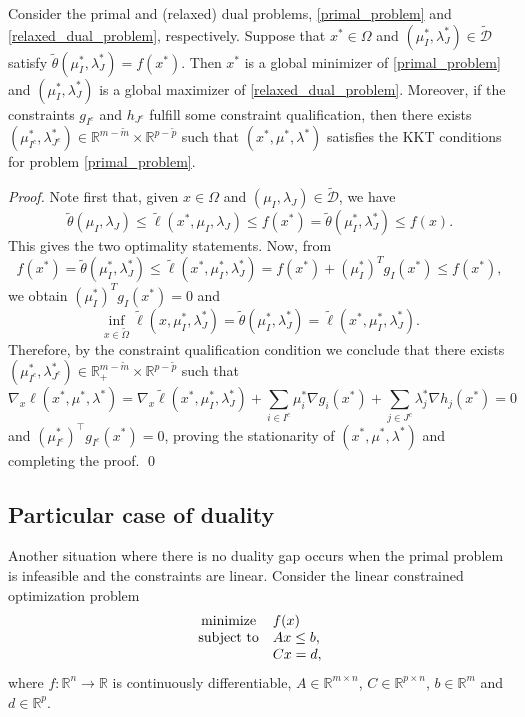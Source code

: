 \documentclass[smallextended,referee,envcountsect]{svjour3}
\newcommand{\R}{\mathbb{R}}
\begin{document}
\begin{theorem}
\label{th:str_dual}
Consider the primal and (relaxed) dual problems, \eqref{primal_problem} and 
\eqref{relaxed_dual_problem}, respectively. Suppose that $x^*\in\Omega$ and 
$(\mu_I^*,\lambda_J^*)\in\mathcal{\widetilde D}$ satisfy 
$\tilde\theta(\mu_I^*,\lambda_J^*)=f(x^*)$. Then $x^*$ is a global 
minimizer of \eqref{primal_problem} and $(\mu_I^*,\lambda_J^*)$ is a global maximizer of 
\eqref{relaxed_dual_problem}. Moreover, if the constraints $g_{I^c}$ and $h_{J^c}$ 
fulfill some constraint qualification, then there exists 
$(\mu_{I^c}^*,\lambda_{J^c}^*)\in\R^{m-\tilde{m}}\times\R^{p-\tilde{p}}$ such that 
$(x^*,\mu^*,\lambda^*)$ satisfies the KKT conditions for problem \eqref{primal_problem}.
\end{theorem}
\begin{proof}
Note first that, given $x\in\Omega$ and $(\mu_I,\lambda_J)\in\mathcal{\widetilde D}$, we have 
$$
\tilde\theta(\mu_I,\lambda_J)\leq\tilde\ell(x^*,\mu_I,\lambda_J)
\leq f(x^*)=\tilde\theta(\mu_I^*,\lambda_J^*)\leq f(x).
$$ 
This gives the two optimality statements. Now, from 
$$
f(x^*)=\tilde\theta(\mu_I^*,\lambda_J^*)\leq\tilde\ell(x^*,\mu_I^*,\lambda_J^*)
=f(x^*)+(\mu_I^*)^Tg_I(x^*)\leq f(x^*),
$$
we obtain $(\mu_I^*)^Tg_I(x^*)=0$ and 
$$
\inf_{x\in\widetilde\Omega}\tilde\ell(x,\mu_I^*,\lambda_J^*)=
\tilde\theta(\mu_I^*,\lambda_J^*)=\tilde\ell(x^*,\mu_I^*,\lambda_J^*).
$$
Therefore, by the constraint qualification condition we conclude that there exists 
$(\mu_{I^c}^*,\lambda_{J^c}^*)\in\R_+^{m-\tilde{m}}\times\R^{p-\tilde{p}}$ such that 
$$
\nabla_x\ell(x^*,\mu^*,\lambda^*)=
\nabla_x\tilde\ell(x^*,\mu_I^*,\lambda_J^*)+\sum_{i\in I^c}\mu_i^*\nabla g_i(x^*)+
\sum_{j\in J^c}\lambda_j^*\nabla h_j(x^*)=0
$$
and $(\mu_{I^c}^*)^\top g_{I^c}(x^*)=0$, proving the stationarity of 
$(x^*,\mu^*,\lambda^*)$ and completing the proof.
\qed\end{proof}


\subsection{Particular case of duality}
\label{sec:dual_empty}
Another situation where there is no duality gap occurs when the primal problem is 
infeasible and the constraints are linear. Consider the linear constrained optimization 
problem 
\begin{equation}
\label{linear_constr_problem}
\begin{array}{cl}
\displaystyle\mathop{\rm minimize }  & f(x) \\
{\rm subject\ to } & Ax\leq b , \\
& Cx=d, 
\end{array}
\end{equation}
where $f:\R^n\to\R$ is continuously differentiable, $A\in\R^{m\times n}$, 
$C\in\R^{p\times n}$, $b\in\R^m$ and $d\in\R^p$.
\end{document}
